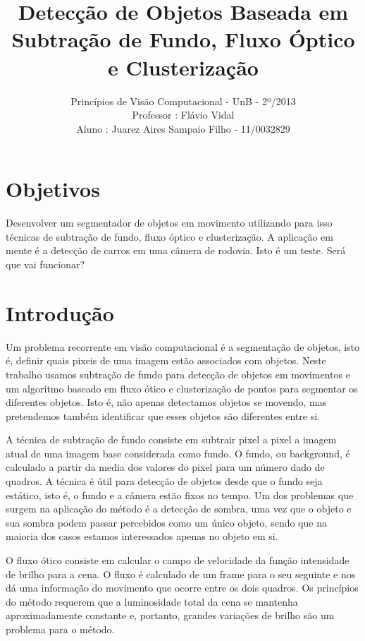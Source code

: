 \documentclass[journal]{IEEEtran}
\begin{document}
\title{ 
Detecção de Objetos Baseada em Subtração de Fundo, Fluxo Óptico e 
Clusterização}
\author{
		Princípios de Visão Computacional - UnB - 2º/2013 \\
		Professor : Flávio Vidal \\
		Aluno : Juarez Aires Sampaio Filho - 11/0032829 \\
		}


\maketitle
\IEEEpeerreviewmaketitle

\section{Objetivos} 
Desenvolver um segmentador de objetos em movimento utilizando para 
isso técnicas de subtração de fundo, fluxo óptico e clusterização.
A aplicação em mente é a detecção de carros em uma câmera de rodovia.
Isto é um teste. Será que vai funcionar?
\section{Introdução}
    Um problema recorrente em visão computacional é 
a segmentação de objetos, isto é, definir quais pixeis de uma
imagem estão associados com objetos. Neste trabalho usamos subtração
de fundo para detecção de objetos em movimentos e um algoritmo baseado
em fluxo ótico e clusterização de pontos para segmentar os diferentes 
objetos. Isto é, não apenas detectamos objetos se movendo, mas 
pretendemos também identificar que esses objetos são diferentes 
entre si.

    A técnica de subtração de fundo consiste em subtrair pixel a 
pixel a imagem atual de uma imagem base considerada como fundo.
O fundo, ou background, é calculado a partir da media dos valores do 
pixel para um número dado de quadros. A técnica é útil para detecção 
de objetos desde que o fundo seja estático, isto é, o fundo e a câmera
estão fixos no tempo. Um dos problemas que surgem na aplicação do 
método é a detecção de sombra, uma vez que o objeto e sua sombra 
podem passar percebidos como um único objeto, sendo que na maioria 
dos casos estamos interessados apenas no objeto em si.

    O fluxo ótico consiste em calcular o campo de velocidade da 
função intensidade de brilho para a cena. O fluxo é calculado de um 
frame para o seu seguinte e nos dá uma informação do movimento que 
ocorre entre os dois quadros. Os princípios do método requerem que a 
luminosidade total da cena se mantenha aproximadamente constante e, 
portanto, grandes variações de brilho são um problema para o método.
\end{document}
